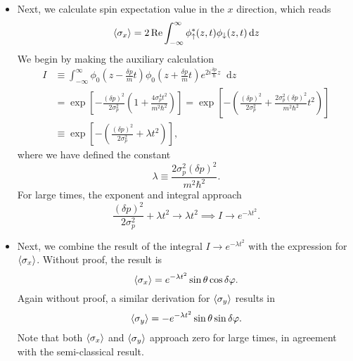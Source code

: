 \documentclass[11pt, a4paper]{article}
\newcommand{\diff}{\mathop{}\!\mathrm{d}} %
\newcommand{\ua}{\uparrow}  %
\newcommand{\da}{\downarrow}  %
\begin{document}
\begin{itemize}
    \item Next, we calculate spin expectation value in the $ x $ direction, which reads
    \begin{equation*}
        \ev{\sigma_{x}} = 2 \Re \int_{-\infty}^{\infty}\phi_{\ua}^{*}(z, t)\phi_{\da}(z, t)\diff z
    \end{equation*}
    We begin by making the auxiliary calculation 
    \begin{align*}
        I & \equiv \int_{-\infty}^{\infty}\phi_{0}\left( z - \frac{\delta p}{m}t \right)\phi_{0}\left( z + \frac{\delta p}{m}t \right)e^{2i \frac{\delta p}{\hbar}z}\diff z\\
        & = \exp \left[ - \frac{(\delta p)^{2}}{2 \sigma_{p}^{2}} \left( 1 + \frac{4 \sigma_{p}^{4}t^{2}}{m^{2}\hbar^{2}} \right) \right]
         = \exp \left[ - \left( \frac{(\delta p)^{2}}{2\sigma_{p}^{2}} + \frac{2 \sigma_{p}^{2} (\delta p)^{2}}{m^{2} \hbar^{2}}t^{2} \right) \right]\\
        &\equiv \exp \left[ - \left( \frac{(\delta p)^{2}}{2\sigma_{p}^{2}} + \lambda t^{2} \right) \right],
    \end{align*}
    where we have defined the constant
    \begin{equation*}
        \lambda \equiv \frac{2 \sigma_{p}^{2}(\delta p)^{2}}{m^{2}\hbar^{2}}.
    \end{equation*}
    For large times, the exponent and integral approach
    \begin{equation*}
        \frac{(\delta p)^{2}}{2\sigma_{p}^{2}} + \lambda t^{2} \to \lambda t^{2} \implies I \to e^{- \lambda t^{2}}.
    \end{equation*}

    \item Next, we combine the result of the integral $ I \to e^{-\lambda t^{2} } $ with the expression for $ \ev{\sigma_{x}} $. Without proof, the result is
    \begin{equation*}
        \ev{\sigma_{x}} = e^{-\lambda t^{2}} \sin \theta \cos \delta \varphi.
    \end{equation*}
    Again without proof, a similar derivation for $ \ev{\sigma_{y}} $ results in
    \begin{equation*}
        \ev{\sigma_{y}} = - e^{-\lambda t^{2}} \sin \theta \sin \delta \varphi.
    \end{equation*}
    Note that both $ \ev{\sigma_{x}} $ and $ \ev{\sigma_{y}} $ approach zero for large times, in agreement with the semi-classical result.
    
\end{itemize}
\end{document}
